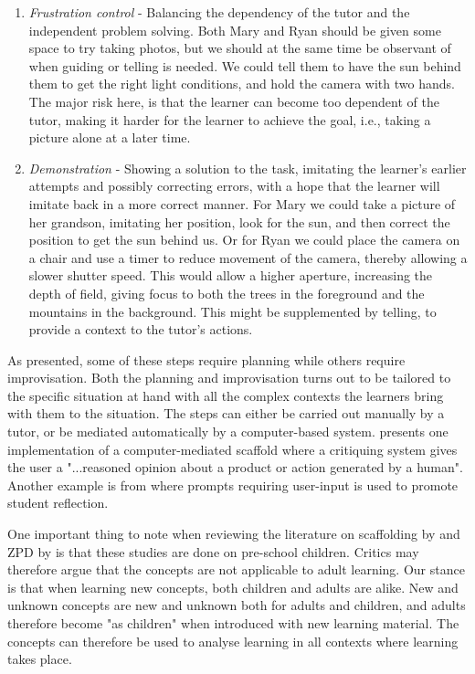 \begin{enumerate}
\item{} \emph{Frustration control} - Balancing the dependency of the tutor and the independent problem solving. Both Mary and Ryan should be given some space to try taking photos, but we should at the same time be observant of when guiding or telling is needed. We could tell them to have the sun behind them to get the right light conditions, and hold the camera with two hands. The major risk here, is that the learner can become too dependent of the tutor, making it harder for the learner to achieve the goal, i.e., taking a picture alone at a later time.  

\item{}  \emph{Demonstration} - Showing a solution to the task, imitating the learner's earlier attempts and possibly correcting errors, with a hope that the learner will imitate back in a more correct manner. For Mary we could take a picture of her grandson, imitating her position, look for the sun, and then correct the position to get the sun behind us. Or for Ryan we could place the camera on a chair and use a timer to reduce movement of the camera, thereby allowing a slower shutter speed. This would allow a higher aperture, increasing the depth of field, giving focus to both the trees in the foreground and the mountains in the background. This might be supplemented by telling, to provide a context to the tutor's actions.
\end{enumerate}

As presented, some of these steps require planning while others require improvisation. Both the planning and improvisation turns out to be tailored to the specific situation at hand with all the complex contexts the learners bring with them to the situation. The steps can either be carried out manually by a tutor, or be mediated automatically by a computer-based system. \citet{fischer1991critics} presents one implementation of a computer-mediated scaffold where a critiquing system gives the user a "...reasoned opinion about a product or action generated by a human". Another example is from \citet{furberg2009socio} where prompts requiring user-input is used to promote student reflection. 

One important thing to note when reviewing the literature on scaffolding by \citet{wood1976role} and ZPD by \citet{vygotskiui1978mind} is that these studies are done on pre-school children. Critics may therefore argue that the concepts are not applicable to adult learning. Our stance is that when learning new concepts, both children and adults are alike. New and unknown concepts are new and unknown both for adults and children, and adults therefore become "as children" when introduced with new learning material. The concepts can therefore be used to analyse learning in all contexts where learning takes place. 

